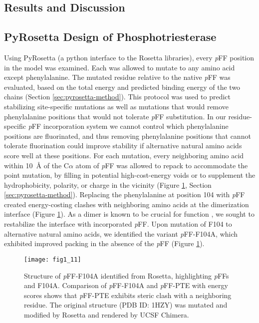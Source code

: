 \begin{refsection}
\section{Results and Discussion}

\subsection{PyRosetta Design of Phosphotriesterase}

Using PyRosetta (a python interface to the Rosetta
libraries)\cite{Leaver-Fay2011}, every \emph{p}FF position in the model was
examined. Each was allowed to mutate to any amino acid except phenylalanine.
The mutated residue relative to the native \emph{p}FF was evaluated, based on
the total energy and predicted binding energy of the two chains (Section
\ref{sec:pyrosetta-method}). This protocol was used to predict stabilizing
site-specific mutations as well as mutations that would remove phenylalanine
positions that would not tolerate \emph{p}FF substitution. In our
residue-specific \emph{p}FF incorporation system we cannot control which
phenylalanine positions are fluorinated, and thus removing phenylalanine
positions that cannot tolerate fluorination could improve stability if
alternative natural amino acids score well at these positions. For each
mutation, every neighboring amino acid within \SI{10}{\angstrom} of the C$\alpha$
atom of \emph{p}FF was allowed to repack to accommodate the point mutation, by
filling in potential high-cost-energy voids or to supplement the
hydrophobicity, polarity, or charge in the vicinity (Figure
\ref{fig:rosetta-pte}, Section \ref{sec:pyrosetta-method}).  Replacing the
phenylalanine at position 104 with \emph{p}FF created energy-costing clashes
with neighboring amino acids at the dimerization interface (Figure
\ref{fig:rosetta-pte}). As a dimer is known to be crucial for
function \cite{Baker2011b}, we sought to restabilize the interface with
incorporated \emph{p}FF. Upon mutation of F104 to alternative natural amino acids, we
identified the variant \emph{p}FF-F104A, which exhibited improved packing in
the absence of the \emph{p}FF (Figure \ref{fig:rosetta-pte}).

\begin{figure}[h!] \centering \texttt{[image: fig1\_11]}
    \caption[Structure of \emph{p}FF-F104A identified from Rosetta,
        highlighting \emph{p}FFs and F104A. Comparison of \emph{p}FF-F104A and
        \emph{p}FF-PTE with energy scores shows that \emph{p}FF-PTE exhibits
        steric clash with a neighboring residue.  The original structure (PDB
        ID: 1HZY) was mutated and modified by Rosetta and rendered by UCSF
    Chimera.]{Structure of \emph{p}FF-F104A identified from Rosetta,
    highlighting \emph{p}FFs and F104A. Comparison of \emph{p}FF-F104A and
    \emph{p}FF-PTE with energy scores shows that \emph{p}FF-PTE exhibits steric
    clash with a neighboring residue. The original structure (PDB ID: 1HZY) was
    mutated and modified by Rosetta and rendered by UCSF Chimera.}
    \label{fig:rosetta-pte}
\end{figure}


\end{refsection}
